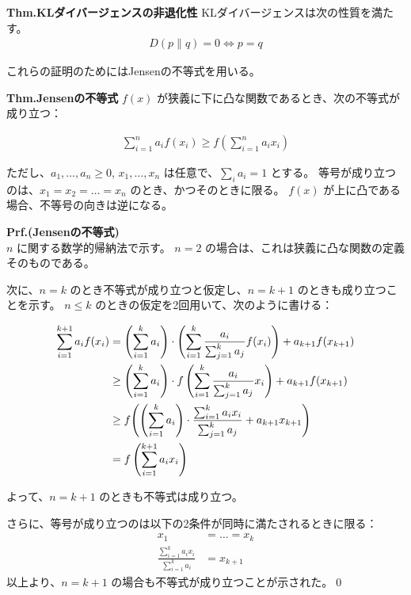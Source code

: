 \documentclass[a4paper,11pt]{jsarticle}
\numberwithin{equation}{section}
\begin{document}
\begin{itembox}[l]{\textbf{Thm.KLダイバージェンスの非退化性}}
    KLダイバージェンスは次の性質を満たす。
    \begin{align}
D(p \| q) = 0 \Leftrightarrow p = q
\end{align}
\end{itembox}
これらの証明のためにはJensenの不等式を用いる。

\begin{itembox}[l]{\textbf{Thm.Jensenの不等式}}
    $f(x)$ が狭義に下に凸な関数であるとき、次の不等式が成り立つ：

\begin{align}
\sum_{i=1}^n a_i f(x_i) \geq f\left( \sum_{i=1}^n a_i x_i \right)
\end{align}

ただし、$a_1, \dots, a_n \geq 0$, $x_1, \dots, x_n$ は任意で、$\sum_i a_i = 1$ とする。  
等号が成り立つのは、$x_1 = x_2 = \dots = x_n$ のとき、かつそのときに限る。  
$f(x)$ が上に凸である場合、不等号の向きは逆になる。
\end{itembox}
\textbf{Prf.(Jensenの不等式)}\\
$n$ に関する数学的帰納法で示す。
$n = 2$ の場合は、これは狭義に凸な関数の定義そのものである。

次に、$n = k$ のとき不等式が成り立つと仮定し、$n = k + 1$ のときも成り立つことを示す。  
$n \leq k$ のときの仮定を2回用いて、次のように書ける：

\begin{align}
\sum_{i=1}^{k+1} a_i f(x_i)
&= \left( \sum_{i=1}^{k} a_i \right)
\cdot \left( \sum_{i=1}^{k} \frac{a_i}{\sum_{j=1}^{k} a_j} f(x_i) \right)
+ a_{k+1} f(x_{k+1}) \\
&\geq \left( \sum_{i=1}^{k} a_i \right)
\cdot f\left( \sum_{i=1}^{k} \frac{a_i}{\sum_{j=1}^{k} a_j} x_i \right)
+ a_{k+1} f(x_{k+1}) \\
&\geq f\qty(\qty(\sum_{i=1}^{k} a_i) \cdot \frac{\sum_{i=1}^{k} a_i x_i}{\sum_{j=1}^{k} a_j} + a_{k+1} x_{k+1}) \\
&= f\left( \sum_{i=1}^{k+1} a_i x_i \right)
\end{align}

よって、$n = k + 1$ のときも不等式は成り立つ。

さらに、等号が成り立つのは以下の2条件が同時に満たされるときに限る：
\begin{align}
x_1 &= \dots = x_k \\
\frac{\sum_{i=1}^{k} a_i x_i}{\sum_{i=1}^{k} a_i} &= x_{k+1}
\end{align}
以上より、$n = k + 1$ の場合も不等式が成り立つことが示された。\qed\\
\end{document}
